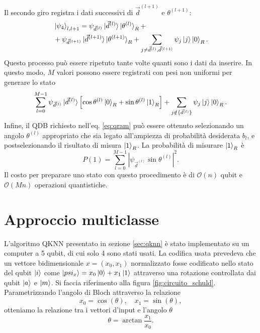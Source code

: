 Il secondo giro registra i dati successivi di $\vec{d}^{(l+1)}$ e $\theta^{(l+1)}$: 
\begin{equation}
    \begin{split}
        &\ket{\psi_4}_{l,l+1} = \psi_{\vec{d}^{(l)}} \ket{\vec{d}^{(l)}} \ket{\theta^{(l)}}_R + \\
        &+ \psi_{\vec{d}^{(l+1)}} \ket{\vec{d}^{(l+1)}} \ket{\theta^{(l+1)}}_R + 
        \sum_{j \neq \vec{d}^{(l)},\vec{d}^{(l+1)}} \psi_j \ket{j} \ket{0}_R.
    \end{split}
\end{equation}
Questo processo può essere ripetuto tante volte quanti sono i dati da inserire. 
In questo modo, $M$ valori possono essere registrati con pesi non uniformi per 
generare lo stato 
\begin{equation}
    \sum_{l=0}^{M-1} \psi_{\vec{d}^{(l)}} \ket{\vec{d}^{(l)}} \left[ \cos\theta^{(l)} 
    \ket{0}_R + \sin\theta^{(l)} \ket{1}_R \right] + 
    \sum_{j \notin \{ \vec{d}^{(l)} \}} \psi_j \ket{j} \ket{0}_R.
\end{equation}
Infine, il \ac{QDB} richiesto nell'eq. \ref{eq:qram} può essere ottenuto 
selezionando un angolo $\theta^{(l)}$ appropriato che sia legato all'ampiezza di 
probabilità desiderata $b_l$, e postselezionando il risultato di misura $\ket{1}_R$. 
La probabilità di misurare $\ket{1}_R$ è 
\begin{equation} \label{eq:qram.prob}
    P(1) = \sum_{l=0}^{M-1} |\psi_{\vec{d}^{(l)}} \sin\theta^{(l)} |^2.
\end{equation}
Il costo per preparare uno stato con questo procedimento è di 
$\mathcal{O}(n)$ qubit e $\mathcal{O}(Mn)$ operazioni quantistiche. 

\section{Approccio multiclasse}

L'algoritmo \ac{QKNN} presentato in sezione \ref{sec:qknn} è stato implementato 
su un computer a 5 qubit, di cui solo 4 sono stati usati. La codifica usata prevedeva 
che un vettore bidimensionale $x = (x_0,x_1)$ normalizzato fosse codificato nello stato del 
qubit $\ket{i}$ come $\ket{psi_x} = x_0 \ket{0} + x_1 \ket{1}$ attraverso una rotazione 
controllata dai qubit $\ket{a}$ e $\ket{m}$. Si faccia riferimento alla figura 
\ref{fig:circuito_schuld}. Parametrizzando l'angolo di Bloch attraverso la relazione 
\begin{equation}
    x_0 = \cos(\theta), \quad x_1 = \sin(\theta),
\end{equation}
otteniamo la relazione tra i vettori d'input e l'angolo $\theta$
\begin{equation}
    \theta = \arctan\frac{x_1}{x_0}. 
\end{equation}

